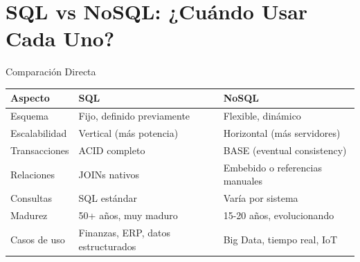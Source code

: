 \documentclass[aspectratio=169]{beamer}
\begin{document}
\section{SQL vs NoSQL: ¿Cuándo Usar Cada Uno?}

\begin{frame}{Comparación Directa}
    \begin{table}[]
        \centering
        \renewcommand{\arraystretch}{1.3}
        \scriptsize
        \begin{tabular}{p{3cm} p{5cm} p{5cm}}
            \toprule
            \textbf{Aspecto} & \textbf{SQL} & \textbf{NoSQL} \\
            \midrule
            Esquema & Fijo, definido previamente & Flexible, dinámico \\
            Escalabilidad & Vertical (más potencia) & Horizontal (más servidores) \\
            Transacciones & ACID completo & BASE (eventual consistency) \\
            Relaciones & JOINs nativos & Embebido o referencias manuales \\
            Consultas & SQL estándar & Varía por sistema \\
            Madurez & 50+ años, muy maduro & 15-20 años, evolucionando \\
            Casos de uso & Finanzas, ERP, datos estructurados & Big Data, tiempo real, IoT \\
            \bottomrule
        \end{tabular}
    \end{table}
\end{frame}
\end{document}
